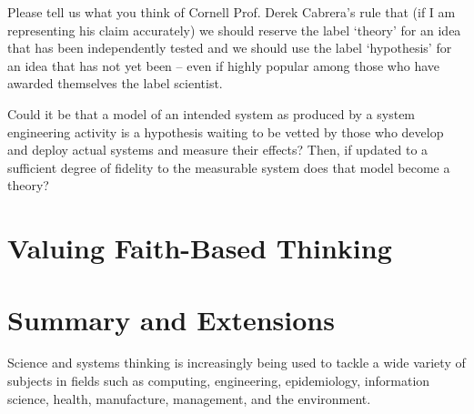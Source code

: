 Please tell us what you think of Cornell Prof. Derek Cabrera’s rule that (if I am representing his claim accurately) we should reserve the label ‘theory’ for an idea that has been independently tested and we should use the label ‘hypothesis’ for an idea that has not yet been – even if highly popular among those who have awarded themselves the label scientist.

Could it be that a model of an intended system as produced by a system engineering activity is a hypothesis waiting to be vetted by those who develop and deploy actual systems and measure their effects?  Then, if updated to a sufficient degree of fidelity to the measurable system does that model become a theory?


\section{Valuing Faith-Based Thinking}


\section{Summary and Extensions}

Science and systems thinking is increasingly being used to tackle a wide variety of subjects in fields such as computing, engineering, epidemiology, information science, health, manufacture, management, and the environment.

